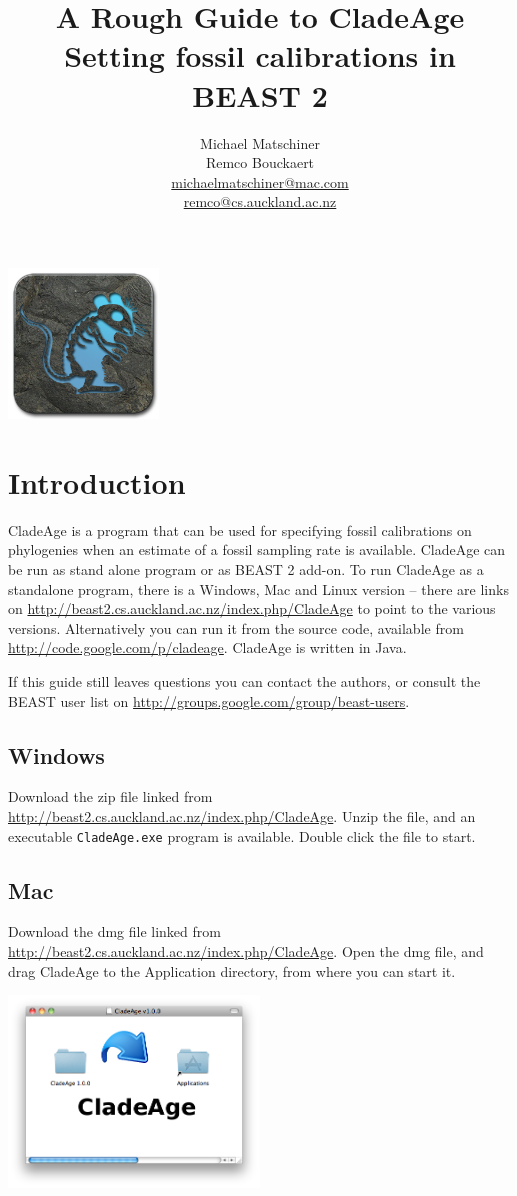 \documentclass{article}
\title{A Rough Guide to CladeAge\\
{\small Setting fossil calibrations in BEAST 2}}
\author{Michael Matschiner \\
Remco Bouckaert\\ 
\url{michaelmatschiner@mac.com}\\
\url{remco@cs.auckland.ac.nz}}
\begin{document}
\maketitle
\begin{center}\includegraphics[width=0.3\textwidth]{cladeage_256x256px.png}\end{center}
\tableofcontents

\section{Introduction}
CladeAge is a program that can be used for specifying fossil calibrations on phylogenies when an estimate of a fossil sampling rate is available. CladeAge can be run as stand alone program or as BEAST 2 add-on. To run CladeAge as a standalone program, there is a Windows, Mac and Linux version -- there are links on  \url{http://beast2.cs.auckland.ac.nz/index.php/CladeAge} to point to the various versions. Alternatively you can run it from the source code, available from \url{http://code.google.com/p/cladeage}. CladeAge is written in Java.

If this guide still leaves questions you can contact the authors,
or consult the BEAST user list on \url{http://groups.google.com/group/beast-users}.

\subsection{Windows}
Download the zip file linked from
\url{http://beast2.cs.auckland.ac.nz/index.php/CladeAge}.
Unzip the file, and an executable {\tt CladeAge.exe} program
is available. Double click the file to start.

\subsection{Mac}
Download the dmg file linked from
\url{http://beast2.cs.auckland.ac.nz/index.php/CladeAge}.
Open the dmg file, and drag CladeAge to the Application directory,
from where you can start it.
\begin{center}\includegraphics[width=0.5\textwidth]{mac.png}\end{center}
\end{document}
